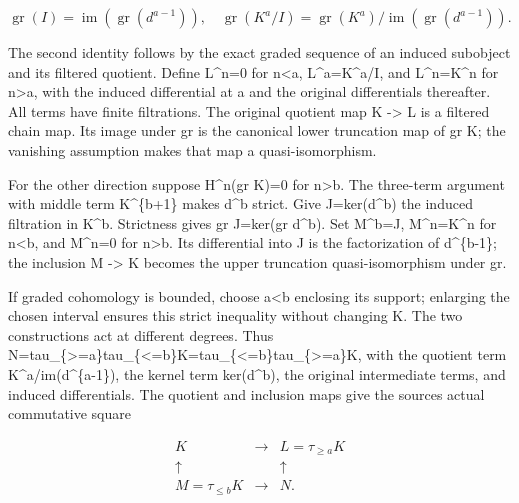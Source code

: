 \[
 \operatorname{gr}(I)=\operatorname{im}(\operatorname{gr}(d^{a-1})),
 \quad
 \operatorname{gr}(K^a/I)=
 \operatorname{gr}(K^a)/\operatorname{im}(\operatorname{gr}(d^{a-1})).
\]

The second identity follows by the exact graded sequence of an induced subobject and its filtered quotient. Define L\textasciicircum{}n\allowbreak{}=0 for n<a,\allowbreak{} L\textasciicircum{}a\allowbreak{}=K\textasciicircum{}a/\allowbreak{}I,\allowbreak{} and L\textasciicircum{}n\allowbreak{}=K\textasciicircum{}n for n>a,\allowbreak{} with the induced differential at a and the original differentials thereafter. All terms have finite filtrations. The original quotient map K \allowbreak{}-> L is a filtered chain map. Its image under gr is the canonical lower truncation map of gr K; the vanishing assumption makes that map a quasi-isomorphism.

For the other direction suppose H\^{}n(gr K)\allowbreak{}\allowbreak{}=0 for n\textgreater b. The three-term argument with middle term K\textasciicircum{}\{b\allowbreak{}+1\} makes d\^{}b strict. Give J\allowbreak{}=ker(d\textasciicircum{}b)\allowbreak{} the induced filtration in K\^{}b. Strictness gives gr J\allowbreak{}=ker(gr d\textasciicircum{}b)\allowbreak{}. Set M\textasciicircum{}b\allowbreak{}=J,\allowbreak{} M\textasciicircum{}n\allowbreak{}=K\textasciicircum{}n for n<b,\allowbreak{} and M\textasciicircum{}n\allowbreak{}=0 for n\textgreater b. Its differential into J is the factorization of d\^{}\{b-1\}; the inclusion M \allowbreak{}-> K becomes the upper truncation quasi-isomorphism under gr.

If graded cohomology is bounded,\allowbreak{} choose a\textless b enclosing its support; enlarging the chosen interval ensures this strict inequality without changing K. The two constructions act at different degrees. Thus N\allowbreak{}=tau\_\allowbreak{}\{>\allowbreak{}=a\}tau\_\allowbreak{}\{<\allowbreak{}=b\}K\allowbreak{}=tau\_\allowbreak{}\{<\allowbreak{}=b\}tau\_\allowbreak{}\{>\allowbreak{}=a\}K,\allowbreak{} with the quotient term K\textasciicircum{}a/\allowbreak{}im(d\textasciicircum{}\{a-1\})\allowbreak{},\allowbreak{} the kernel term ker(d\textasciicircum{}b)\allowbreak{},\allowbreak{} the original intermediate terms,\allowbreak{} and induced differentials. The quotient and inclusion maps give the source\textquotesingle s actual commutative square

\[
 \begin{array}{ccc}
 K&\longrightarrow&L=\tau_{\ge a}K\\
 \uparrow&&\uparrow\\
 M=\tau_{\le b}K&\longrightarrow&N.
 \end{array}
\]

